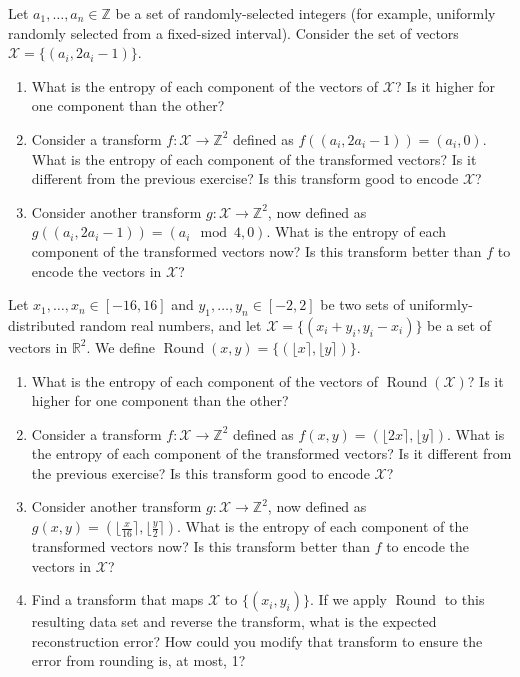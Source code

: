 \begin{exercise}
Let $a_1, \ldots, a_n\in\mathbb{Z}$ be a set of randomly-selected integers (for example, uniformly randomly selected from a fixed-sized interval). Consider the set of vectors $\mathcal{X}=\lbrace (a_i, 2a_i -1) \rbrace$.
\begin{enumerate}
\item What is the entropy of each component of the vectors of $\mathcal{X}$? Is it higher for one component than the other?
\item Consider a transform $f : \mathcal{X} \rightarrow \mathbb{Z}^2$ defined as $f((a_i, 2a_i -1)) = (a_i, 0)$. What is the entropy of each component of the transformed vectors? Is it different from the previous exercise? Is this transform good to encode $\mathcal{X}$?
\item Consider another transform $g : \mathcal{X} \rightarrow \mathbb{Z}^2$, now defined as $g((a_i, 2a_i -1)) = (a_i \mod 4, 0)$. What is the entropy of each component of the transformed vectors now? Is this transform better than $f$ to encode the vectors in $\mathcal{X}$?
\end{enumerate}
\end{exercise}

\begin{exercise}
Let $x_1, \ldots , x_n \in [-16,16]$ and $y_1, \ldots , y_n \in [-2,2]$ be two sets of uniformly-distributed random real numbers, and let $\mathcal{X}=\lbrace (x_i + y_i, y_i - x_i) \rbrace$ be a set of vectors in $\mathbb{R}^2$. We define $\operatorname{Round}(x,y) = \lbrace (\lfloor x \rceil, \lfloor y \rceil ) \rbrace$.
\begin{enumerate}
\item What is the entropy of each component of the vectors of $\operatorname{Round}(\mathcal{X})$? Is it higher for one component than the other?
\item Consider a transform $f : \mathcal{X} \rightarrow \mathbb{Z}^2$ defined as $f(x,y) = (\lfloor 2x \rceil, \lfloor y \rceil)$. What is the entropy of each component of the transformed vectors? Is it different from the previous exercise? Is this transform good to encode $\mathcal{X}$?
\item Consider another transform $g : \mathcal{X} \rightarrow \mathbb{Z}^2$, now defined as $g(x,y) = (\lfloor \frac{x}{16} \rceil, \lfloor \frac{y}{2} \rceil)$. What is the entropy of each component of the transformed vectors now? Is this transform better than $f$ to encode the vectors in $\mathcal{X}$?
\item Find a transform that maps $\mathcal{X}$ to $\lbrace (x_i,y_i) \rbrace$. If we apply $\operatorname{Round}$ to this resulting data set and reverse the transform, what is the expected reconstruction error? How could you modify that transform to ensure the error from rounding is, at most, 1?
\end{enumerate}
\end{exercise}

